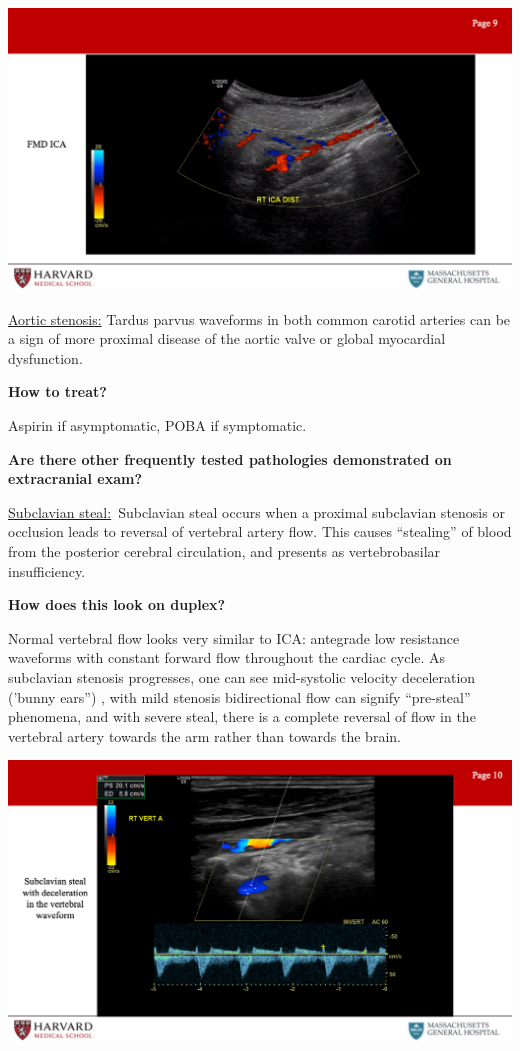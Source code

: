 \documentclass[
]{book}
\begin{document}
\includegraphics[width=15.01in]{images/vasc_lab2/Slide10}

\uline{Aortic stenosis:} Tardus parvus waveforms in both common
carotid arteries can be a sign of more proximal disease of the aortic
valve or global myocardial dysfunction.

\textbf{How to treat?}

Aspirin if asymptomatic, POBA if symptomatic.

\textbf{Are there other frequently tested pathologies demonstrated on
extracranial exam?}

\uline{Subclavian steal:}~Subclavian steal occurs when a proximal
subclavian stenosis or occlusion leads to reversal of vertebral artery
flow. This causes ``stealing'' of blood from the posterior cerebral
circulation, and presents as vertebrobasilar insufficiency.

\textbf{How does this look on duplex?}

Normal vertebral flow looks very similar to ICA: antegrade low
resistance waveforms with constant forward flow throughout the cardiac
cycle. As subclavian stenosis progresses, one can see mid-systolic
velocity deceleration ('bunny ears'') , with mild stenosis bidirectional
flow can signify ``pre-steal'' phenomena, and with severe steal, there is
a complete reversal of flow in the vertebral artery towards the arm
rather than towards the brain.\citep{kalaria2005, mousa2017}

\includegraphics[width=15.01in]{images/vasc_lab2/Slide11}
\end{document}
